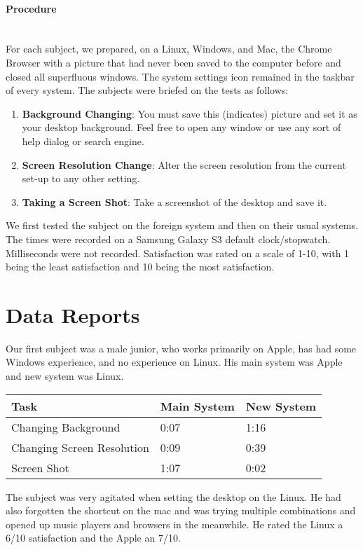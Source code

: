 \documentclass[12pt, onesided, letterpaper]{report}
\begin{document}
\paragraph*{Procedure} ~\\
For each subject, we prepared, on a Linux, Windows, and Mac, the Chrome Browser with a picture that had never been saved to the computer before and closed all superfluous windows. The system settings icon remained in the taskbar of every system.  The subjects were briefed on the tests as follows:
\begin{enumerate}
\item \textbf{Background Changing}: You must save this (indicates) picture and set it as your desktop background.  Feel free to open any window or use any sort of help dialog or search engine.
\item \textbf{Screen Resolution Change}: Alter the screen resolution from the current set-up to any other setting.
\item \textbf{Taking a Screen Shot}: Take a screenshot of the desktop and save it.
\end{enumerate}
We first tested the subject on the foreign system and then on their usual systems. The times were recorded on a Samsung Galaxy S3 default clock/stopwatch.  Milliseconds were not recorded.  Satisfaction was rated on a scale of 1-10, with 1 being the least satisfaction and 10 being the most satisfaction.
\pagebreak

\section*{Data Reports}
Our first subject was a male junior, who works primarily on Apple, has had some Windows experience, and no experience on Linux. His main system was Apple and new system was Linux.
\begin{center}
    \begin{tabular}{ | l | l | l |}
    \hline
    Task &Main System & New System  \\ \hline
    Changing Background & 0:07 & 1:16  \\ \hline
    Changing Screen Resolution & 0:09 & 0:39  \\ \hline
    Screen Shot & 1:07 & 0:02 \\
    \hline
    \end{tabular}
\end{center}
The subject was very agitated when setting the desktop on the Linux.  He had also forgotten the shortcut on the mac and was trying multiple combinations and opened up music players and browsers in the meanwhile. 
He rated the Linux a 6/10 satisfaction and the Apple an 7/10.
\end{document}
